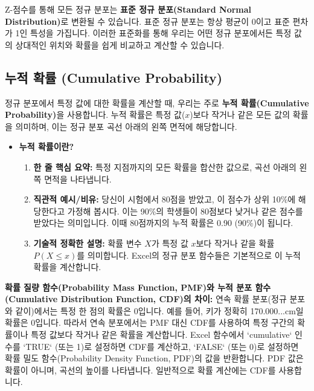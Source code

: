 \documentclass[11pt,a4paper]{article}
\begin{document}
Z-점수를 통해 모든 정규 분포는 \textbf{표준 정규 분포(Standard Normal Distribution)}로 변환될 수 있습니다.
표준 정규 분포는 항상 평균이 0이고 표준 편차가 1인 특성을 가집니다.
이러한 표준화를 통해 우리는 어떤 정규 분포에서든 특정 값의 상대적인 위치와 확률을 쉽게 비교하고 계산할 수 있습니다.

\subsection{누적 확률 (Cumulative Probability)}
정규 분포에서 특정 값에 대한 확률을 계산할 때, 우리는 주로 \textbf{누적 확률(Cumulative Probability)}을 사용합니다.
누적 확률은 특정 값($x$)보다 작거나 같은 모든 값의 확률을 의미하며, 이는 정규 분포 곡선 아래의 왼쪽 면적에 해당합니다.

\begin{itemize}
    \item \textbf{누적 확률이란?}
    \begin{enumerate}
        \item \textbf{한 줄 핵심 요약:} 특정 지점까지의 모든 확률을 합산한 값으로, 곡선 아래의 왼쪽 면적을 나타냅니다.
        \item \textbf{직관적 예시/비유:} 당신이 시험에서 80점을 받았고, 이 점수가 상위 10\%에 해당한다고 가정해 봅시다. 이는 90\%의 학생들이 80점보다 낮거나 같은 점수를 받았다는 의미입니다. 이때 80점까지의 누적 확률은 0.90 (90\%)이 됩니다.
        \item \textbf{기술적 정확한 설명:} 확률 변수 $X$가 특정 값 $x$보다 작거나 같을 확률 $P(X \le x)$를 의미합니다. Excel의 정규 분포 함수들은 기본적으로 이 누적 확률을 계산합니다.
    \end{enumerate}
\end{itemize}

\begin{cautionbox}
    \textbf{확률 질량 함수(Probability Mass Function, PMF)와 누적 분포 함수(Cumulative Distribution Function, CDF)의 차이:}
    연속 확률 분포(정규 분포와 같이)에서는 특정 한 점의 확률은 0입니다. 예를 들어, 키가 정확히 170.000...cm일 확률은 0입니다. 따라서 연속 분포에서는 PMF 대신 CDF를 사용하여 특정 구간의 확률이나 특정 값보다 작거나 같은 확률을 계산합니다. Excel 함수에서 `cumulative` 인수를 `TRUE` (또는 1)로 설정하면 CDF를 계산하고, `FALSE` (또는 0)로 설정하면 확률 밀도 함수(Probability Density Function, PDF)의 값을 반환합니다. PDF 값은 확률이 아니며, 곡선의 높이를 나타냅니다. 일반적으로 확률 계산에는 CDF를 사용합니다.
\end{cautionbox}
\end{document}
